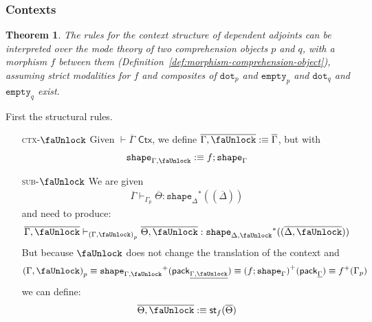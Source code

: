 \documentclass[10pt]{article}
\newtheorem{theorem}{Theorem}
\theoremstyle{definition}
\newcommand{\yields}{\vdash}
\newcommand{\CTX}{\,\,\mathsf{Ctx}}
\newcommand\St[2]{\ensuremath{{#1}^*(#2)}}
\newcommand\StI[2]{\ensuremath{\mathsf{st}_{#1}(#2)}}
\newcommand\TrPlus[2]{\ensuremath{{#1}^+(#2)}}
\newcommand\ctxtuple[1]{(#1)}
\newcommand\pack[1]{\ensuremath{\mathsf{pack}_{#1}}}
\newcommand{\modeof}[1]{{#1}_p}
\newcommand{\tdot}{\ensuremath{\mathtt{dot}}}
\newcommand{\tempty}{\ensuremath{\mathtt{empty}}}
\newcommand{\tshape}[1]{\ensuremath{\mathtt{shape}_{#1}}}
\newcommand{\upstairs}[1]{\overline{#1}}
\newcommand{\downstairs}[1]{\underline{#1}}
\newcommand{\lock}{\text{\faUnlock}}
\begin{document}
\subsubsection{Contexts}

\begin{theorem}
  The rules for the context structure of dependent adjoints can be
  interpreted over the mode theory of two comprehension objects $p$ and
  $q$, with a morphism $f$ between them
  (Definition~\ref{def:morphism-comprehension-object}), assuming strict
  modalities for $f$ and composites of $\tdot_p$ and $\tempty_p$ and
  $\tdot_q$ and $\tempty_q$ exist.
\end{theorem}

First the structural rules.
\begin{enumerate}
\item[\textsc{ctx-$\lock$}] Given $\yields \upstairs{\Gamma} \CTX$, we define $\upstairs{\Gamma, \lock} :\equiv \upstairs{\Gamma}$, but with
\begin{align*}
\tshape{\Gamma, \lock} :\equiv f ; \tshape{\Gamma}
\end{align*}
%
\item[\textsc{sub-$\lock$}] We are given
\begin{align*}
\upstairs{\Gamma} \yields_{\modeof{\Gamma}} \upstairs{\Theta} : \St{\tshape{\Delta}}{\ctxtuple{\upstairs{\Delta}}}
\end{align*}
and need to produce:
\begin{align*}
\upstairs{\Gamma, \lock} \yields_{\modeof{(\Gamma, \lock)}} \upstairs{\Theta, \lock} : \St{\tshape{\Delta, \lock}}{\ctxtuple{\upstairs{\Delta, \lock}}}
\end{align*}
But because $\lock$ does not change the translation of the context and
\begin{align*}
\modeof{(\Gamma, \lock)} \equiv \TrPlus{\tshape{\Gamma, \lock}}{\pack{\downstairs{\Gamma, \lock}}} \equiv \TrPlus{(f;\tshape{\Gamma})}{\pack{\downstairs{\Gamma}}} \equiv \TrPlus{f}{\modeof{\Gamma}}
\end{align*}
we can define:
\begin{align*}
\upstairs{\Theta, \lock} :\equiv \StI{f}{\upstairs{\Theta}}
\end{align*}
\end{enumerate}
\end{document}
